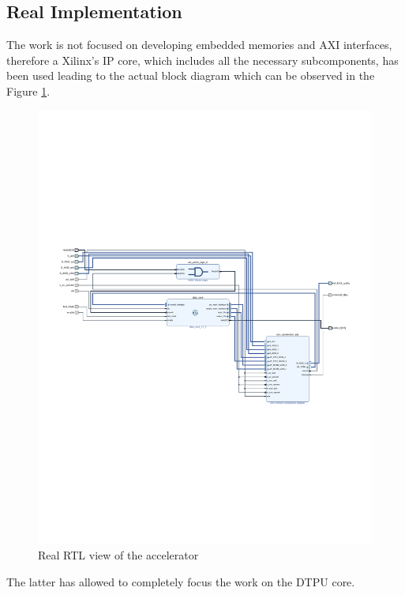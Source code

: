 \subsection{Real Implementation}
The work is not focused on developing embedded memories and AXI interfaces, therefore a Xilinx's IP core, which includes all the necessary subcomponents, has been used\cite{paper:43} leading to the actual block diagram which can be observed in the Figure \ref{fig:rtlaccel}.
\begin{figure}[H]
\centering
\captionsetup{justification=centering}
\includegraphics[scale=1.1,angle=90]{./figure/accelerator_schematic.pdf}
\caption{Real RTL view of the accelerator}
\label{fig:rtlaccel}
\end{figure} 
The latter has allowed to completely focus the work on the DTPU core.
\newpage
